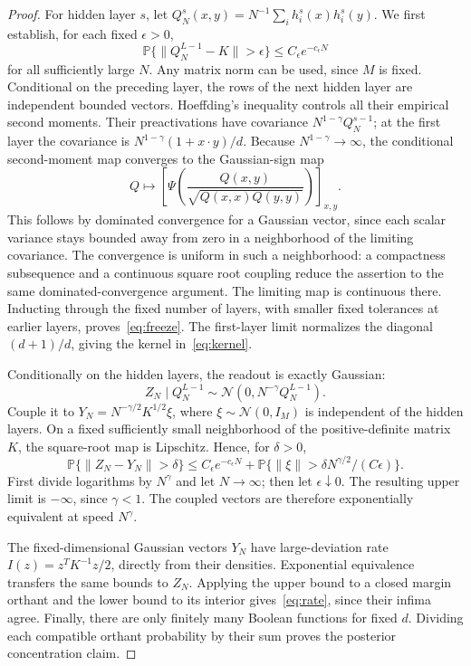 \begin{proof}
For hidden layer $s$, let
$Q_N^s(x,y)=N^{-1}\sum_i h_i^s(x)h_i^s(y)$.
We first establish, for each fixed $\epsilon>0$,
\begin{equation}\label{eq:freeze}
 \mathbb P\{\|Q_N^{L-1}-K\|>\epsilon\}
       \le C_\epsilon e^{-c_\epsilon N}
\end{equation}
for all sufficiently large $N$. Any matrix norm can be used, since
$M$ is fixed. Conditional on the preceding layer, the rows of the
next hidden layer are independent bounded vectors. Hoeffding's
inequality controls all their empirical second moments. Their
preactivations have covariance $N^{1-\gamma}Q_N^{s-1}$; at the first
layer the covariance is
$N^{1-\gamma}(1+x\cdot y)/d$. Because $N^{1-\gamma}\to\infty$,
the conditional second-moment map converges to the Gaussian-sign map
\[
 Q\longmapsto \left[\Psi\!\left(
 \frac{Q(x,y)}{\sqrt{Q(x,x)Q(y,y)}}\right)\right]_{x,y}.
\]
This follows by dominated convergence for a Gaussian vector, since
each scalar variance stays bounded away from zero in a neighborhood
of the limiting covariance. The convergence is uniform in such a
neighborhood: a compactness subsequence and a continuous square root
coupling reduce the assertion to the same dominated-convergence
argument. The limiting map is continuous there. Inducting through
the fixed number of layers, with smaller fixed tolerances at earlier
layers, proves~\eqref{eq:freeze}. The first-layer limit normalizes
the diagonal $(d+1)/d$, giving the kernel in~\eqref{eq:kernel}.

Conditionally on the hidden layers, the readout is exactly Gaussian:
\begin{equation}\label{eq:readout}
 Z_N\mid Q_N^{L-1}\sim\mathcal N(0,N^{-\gamma}Q_N^{L-1}).
\end{equation}
Couple it to $Y_N=N^{-\gamma/2}K^{1/2}\xi$, where
$\xi\sim\mathcal N(0,I_M)$ is independent of the hidden layers.
On a fixed sufficiently small neighborhood of the positive-definite
matrix $K$, the square-root map is Lipschitz. Hence, for $\delta>0$,
\[
 \mathbb P\{\|Z_N-Y_N\|>\delta\}
 \le C_\epsilon e^{-c_\epsilon N}
 +\mathbb P\{\|\xi\|>\delta N^{\gamma/2}/(C\epsilon)\}.
\]
First divide logarithms by $N^\gamma$ and let $N\to\infty$;
then let $\epsilon\downarrow0$. The resulting upper limit is
$-\infty$, since $\gamma<1$. The coupled vectors are therefore
exponentially equivalent at speed $N^\gamma$.

The fixed-dimensional Gaussian vectors $Y_N$ have large-deviation
rate $I(z)=z^TK^{-1}z/2$, directly from their densities. Exponential
equivalence transfers the same bounds to $Z_N$. Applying the upper
bound to a closed margin orthant and the lower bound to its interior
gives~\eqref{eq:rate}, since their infima agree. Finally, there are
only finitely many Boolean functions for fixed $d$. Dividing each
compatible orthant probability by their sum proves the posterior
concentration claim.
\end{proof}

